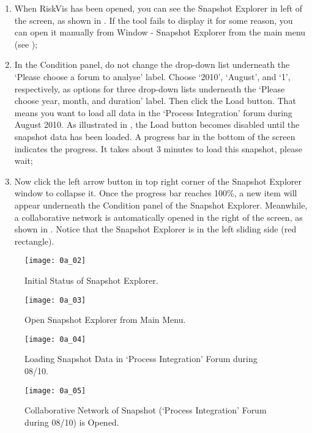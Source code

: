 \begin{enumerate}
	\item When RiskVis has been opened, you can see the Snapshot Explorer in left of the screen, as shown in . If the tool fails to display it for some reason, you can open it manually from Window - Snapshot Explorer from the main menu (see ); \\
	\item In the Condition panel, do not change the drop-down list underneath the `Please choose a forum to analyse' label. Choose `2010', `August', and `1', respectively, as options for three drop-down lists underneath the `Please choose year, month, and duration' label. Then click the Load button. That means you want to load all data in the `Process Integration' forum during August 2010. As illustrated in , the Load button becomes disabled until the snapshot data has been loaded. A progress bar in the bottom of the screen indicates the progress. It takes about 3 minutes to load this snapshot, please wait; \\
	\item Now click the left arrow button in top right corner of the Snapshot Explorer window to collapse it. Once the progress bar reaches 100\%, a new item will appear underneath the Condition panel of the Snapshot Explorer. Meanwhile, a collaborative network is automatically opened in the right of the screen, as shown in . Notice that the Snapshot Explorer is in the left sliding side (red rectangle). \\
\end{enumerate}

\begin{figure}[!htb]
  \centering
  \texttt{[image: 0a\_02]}
  \caption{Initial Status of Snapshot Explorer.}
  \label{Figure:0a_02}
\end{figure}

\begin{figure}[!htb]
  \centering
  \texttt{[image: 0a\_03]}
  \caption{Open Snapshot Explorer from Main Menu.}
  \label{Figure:0a_03}
\end{figure}

\begin{figure}[!htb]
  \centering
  \texttt{[image: 0a\_04]}
  \caption{Loading Snapshot Data in `Process Integration' Forum during 08/10.}
  \label{Figure:0a_04}
\end{figure}

\begin{figure}[!htb]
  \centering
  \texttt{[image: 0a\_05]}
  \caption{Collaborative Network of Snapshot (`Process Integration' Forum during 08/10) is Opened.}
  \label{Figure:0a_05}
\end{figure}

